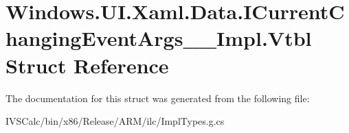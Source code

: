 \hypertarget{struct_windows_1_1_u_i_1_1_xaml_1_1_data_1_1_i_current_changing_event_args_____impl_1_1_vtbl}{}\section{Windows.\+U\+I.\+Xaml.\+Data.\+I\+Current\+Changing\+Event\+Args\+\_\+\+\_\+\+Impl.\+Vtbl Struct Reference}
\label{struct_windows_1_1_u_i_1_1_xaml_1_1_data_1_1_i_current_changing_event_args_____impl_1_1_vtbl}


The documentation for this struct was generated from the following file\+:\begin{DoxyCompactItemize}
\item 
I\+V\+S\+Calc/bin/x86/\+Release/\+A\+R\+M/ilc/Impl\+Types.\+g.\+cs\end{DoxyCompactItemize}
